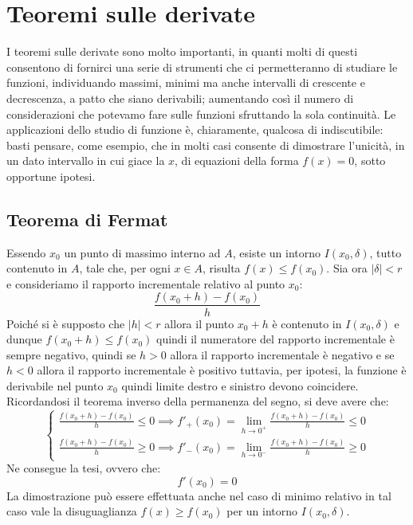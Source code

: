 \documentclass{report}
\begin{document}
\chapter{Teoremi sulle derivate}
I teoremi sulle derivate sono molto importanti, in quanti molti di questi consentono di fornirci una serie di strumenti che ci permetteranno di studiare le funzioni, individuando massimi, minimi ma anche intervalli di crescente e decrescenza, a patto che siano derivabili; aumentando così il numero di considerazioni che potevamo fare sulle funzioni sfruttando la sola continuità. Le applicazioni dello studio di funzione è, chiaramente, qualcosa di indiscutibile: basti pensare, come esempio, che in molti casi consente di dimostrare l'unicità, in un dato intervallo in cui giace la $x$, di equazioni della forma $f(x) = 0$, sotto opportune ipotesi. 
\section{Teorema di Fermat}
\begin{myproof}
Essendo $x_0$ un punto di massimo interno ad $A$, esiste un intorno $I(x_0, \delta)$, tutto contenuto in $A$, tale che, per ogni $x \in A$, risulta $f(x)\leq f(x_0)$.
Sia ora $|\delta|<r$ e consideriamo il rapporto incrementale relativo al punto $x_0$:
$$
\frac{f(x_0 + h)-f(x_0)}{h}
$$
Poiché si è supposto che $|h| < r$ allora il punto $x_0 + h$ è contenuto in $I(x_0, \delta)$ e dunque $f(x_0 + h) \leq f(x_0)$ quindi il numeratore del rapporto incrementale è sempre negativo, quindi se $h > 0$ allora il rapporto incrementale è negativo e se $h < 0$ allora il rapporto incrementale è positivo tuttavia, per ipotesi, la funzione è derivabile nel punto $x_0$ quindi limite destro e sinistro devono coincidere. Ricordandosi il teorema inverso della permanenza del segno, si deve avere che:
\begin{equation}	
	\begin{cases}
		\frac{f(x_0 + h) - f(x_0)}{h} \leq 0 \implies f'_{+}(x_0) = \lim\limits_{h \to 0^{+}} \frac{f(x_0 + h) - f(x_0)}{h} \leq 0 \\
\frac{f(x_0 + h) - f(x_0)}{h} \geq 0 \implies f'_{-}(x_0) = \lim\limits_{h \to 0^{-}} \frac{f(x_0 + h) - f(x_0)}{h} \geq 0
\end{cases}
\end{equation}
Ne consegue la tesi, ovvero che:
$$
	f'(x_0) = 0
$$
La dimostrazione può essere effettuata anche nel caso di minimo relativo in tal caso vale la disuguaglianza $f(x)\geq f(x_0)$ per un intorno $I(x_0, \delta)$.
\end{myproof}
\end{document}
